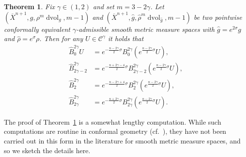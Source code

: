\documentclass{amsart}
\newtheorem{thm}{Theorem}[section]
\theoremstyle{definition}
\theoremstyle{remark}
\numberwithin{equation}{section}
\begin{document}
\begin{thm}
\label{thm:invariant}
 Fix $\gamma\in(1,2)$ and set $m=3-2\gamma$.  Let $({\overline{X}}^{n+1},g,\rho^m\operatorname{dvol}_g,m-1)$ and $({\overline{X}}^{n+1},{\widehat{g}},{\widehat{\rho}}^m\operatorname{dvol}_{\widehat{g}},m-1)$ be two pointwise conformally equivalent $\gamma$-admissible smooth metric measure spaces with ${\widehat{g}}=e^{2\sigma}g$ and ${\widehat{\rho}}=e^\sigma\rho$.  Then for any $U\in{\mathcal{C}}^\gamma$ it holds that
 \begin{align}
  \label{eqn:invariant2/0} {\widehat{B}}_{0}^{2\gamma}U & = e^{-\frac{n-2\gamma}{2}\sigma}B_{0}^{2\gamma}\left(e^{\frac{n-2\gamma}{2}\sigma}U\right), \\
  \label{eqn:invariant2/1} {\widehat{B}}_{2\gamma-2}^{2\gamma} & = e^{-\frac{n+2\gamma-4}{2}\sigma}B_{2\gamma-2}^{2\gamma}\left(e^{\frac{n-2\gamma}{2}\sigma}U\right), \\
  \label{eqn:invariant2/2} {\widehat{B}}_{2}^{2\gamma} & = e^{-\frac{n-2\gamma+4}{2}\sigma}B_{2}^{2\gamma}\left(e^{\frac{n-2\gamma}{2}\sigma}U\right), \\
  \label{eqn:invariant2/3} {\widehat{B}}_{2\gamma}^{2\gamma} & = e^{-\frac{n+2\gamma}{2}\sigma}B_{2\gamma}^{2\gamma}\left(e^{\frac{n-2\gamma}{2}\sigma}U\right) .
 \end{align}
\end{thm}

The proof of Theorem~\ref{thm:invariant} is a somewhat lengthy computation.  While such computations are routine in conformal geometry (cf.\ \cite{Branson1985,ChangQing1997a}), they have not been carried out in this form in the literature for smooth metric measure spaces, and so we sketch the details here.
\end{document}
